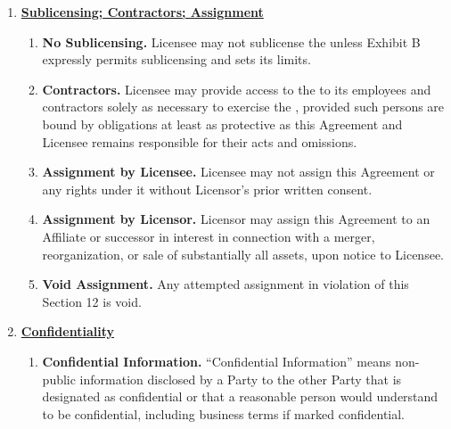 \begin{enumerate}[leftmargin=*, label=\arabic*.]
\begin{enumerate}[leftmargin=*, label=\arabic{enumi}.\arabic*]
		\item \textbf{Cap.} TO THE MAXIMUM EXTENT PERMITTED BY LAW, LICENSOR'S TOTAL LIABILITY
		FOR DIRECT DAMAGES ARISING OUT OF OR RELATED TO THIS AGREEMENT WILL NOT EXCEED THE AMOUNT
		ACTUALLY PAID BY LICENSEE TO LICENSOR UNDER THIS AGREEMENT (IF ANY).
	\end{enumerate}

	\item \textbf{\uline{Sublicensing; Contractors; Assignment}}

	\begin{enumerate}[leftmargin=*, label=\arabic{enumi}.\arabic*]
		\item \textbf{No Sublicensing.} Licensee may not sublicense the \licensedIP unless
		Exhibit B expressly permits sublicensing and sets its limits.

		\item \textbf{Contractors.} Licensee may provide access to the \licensedIP to its
		employees and contractors solely as necessary to exercise the \permittedUses, provided
		such persons are bound by obligations at least as protective as this Agreement and
		Licensee remains responsible for their acts and omissions.

		\item \textbf{Assignment by Licensee.} Licensee may not assign this Agreement or any
		rights under it without Licensor's prior written consent.

		\item \textbf{Assignment by Licensor.} Licensor may assign this Agreement to an Affiliate
		or successor in interest in connection with a merger, reorganization, or sale of
		substantially all assets, upon notice to Licensee.

		\item \textbf{Void Assignment.} Any attempted assignment in violation of this Section 12
		is void.
	\end{enumerate}

	\item \textbf{\uline{Confidentiality}}

	\begin{enumerate}[leftmargin=*, label=\arabic{enumi}.\arabic*]
		\item \textbf{Confidential Information.} ``Confidential Information'' means non-public
		information disclosed by a Party to the other Party that is designated as confidential or
		that a reasonable person would understand to be confidential, including business terms if
		marked confidential.


\end{enumerate}
\end{enumerate}
